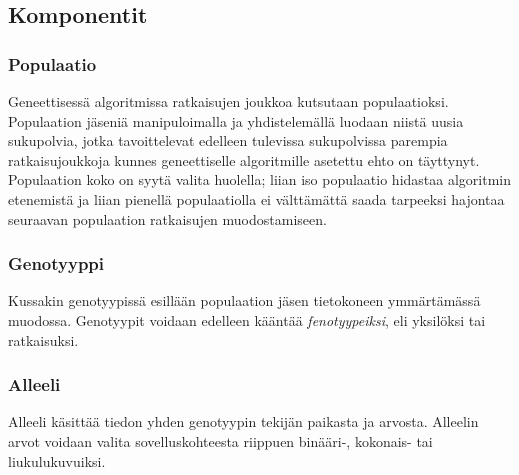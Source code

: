 \subsection{Komponentit} \label{komponentit}

\subsubsection{Populaatio}

Geneettisessä algoritmissa ratkaisujen joukkoa kutsutaan populaatioksi. Populaation jäseniä
manipuloimalla ja yhdistelemällä luodaan niistä uusia sukupolvia, jotka tavoittelevat edelleen
tulevissa sukupolvissa parempia ratkaisujoukkoja kunnes geneettiselle algoritmille asetettu ehto
on täyttynyt. Populaation koko on syytä valita huolella; liian iso populaatio hidastaa algoritmin
etenemistä ja liian pienellä populaatiolla ei välttämättä saada tarpeeksi hajontaa seuraavan
populaation ratkaisujen muodostamiseen.

\subsubsection{Genotyyppi}
Kussakin genotyypissä esillään populaation jäsen tietokoneen ymmärtämässä muodossa. Genotyypit voidaan
edelleen kääntää \textit{fenotyypeiksi}, eli yksilöksi tai ratkaisuksi.

\subsubsection{Alleeli}
Alleeli käsittää tiedon yhden genotyypin tekijän paikasta ja arvosta.
Alleelin arvot voidaan valita sovelluskohteesta riippuen binääri-, kokonais- tai liukulukuvuiksi.
